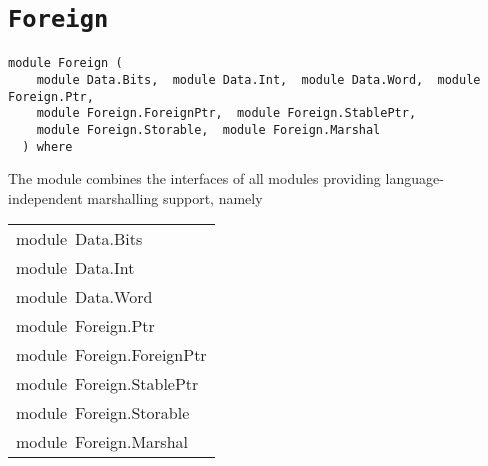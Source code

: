 \chapter{\texttt{Foreign}}
\label{module:Foreign}
\haddockbeginheader
{\haddockverb\begin{verbatim}
module Foreign (
    module Data.Bits,  module Data.Int,  module Data.Word,  module Foreign.Ptr, 
    module Foreign.ForeignPtr,  module Foreign.StablePtr, 
    module Foreign.Storable,  module Foreign.Marshal
  ) where\end{verbatim}}
\haddockendheader

The module  combines the interfaces of all
 modules providing language-independent marshalling support,
 namely
\par

\begin{haddockdesc}
\item[\begin{tabular}{@{}l}
module\ Data.Bits\\module\ Data.Int\\module\ Data.Word\\module\ Foreign.Ptr\\module\ Foreign.ForeignPtr\\module\ Foreign.StablePtr\\module\ Foreign.Storable\\module\ Foreign.Marshal
\end{tabular}]
\end{haddockdesc}